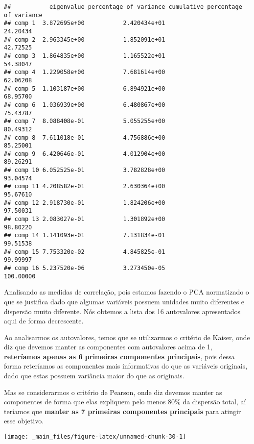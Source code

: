 \documentclass[
]{article}
\begin{document}
\begin{verbatim}
##           eigenvalue percentage of variance cumulative percentage of variance
## comp 1  3.872695e+00           2.420434e+01                          24.20434
## comp 2  2.963345e+00           1.852091e+01                          42.72525
## comp 3  1.864835e+00           1.165522e+01                          54.38047
## comp 4  1.229058e+00           7.681614e+00                          62.06208
## comp 5  1.103187e+00           6.894921e+00                          68.95700
## comp 6  1.036939e+00           6.480867e+00                          75.43787
## comp 7  8.088408e-01           5.055255e+00                          80.49312
## comp 8  7.611018e-01           4.756886e+00                          85.25001
## comp 9  6.420646e-01           4.012904e+00                          89.26291
## comp 10 6.052525e-01           3.782828e+00                          93.04574
## comp 11 4.208582e-01           2.630364e+00                          95.67610
## comp 12 2.918730e-01           1.824206e+00                          97.50031
## comp 13 2.083027e-01           1.301892e+00                          98.80220
## comp 14 1.141093e-01           7.131834e-01                          99.51538
## comp 15 7.753320e-02           4.845825e-01                          99.99997
## comp 16 5.237520e-06           3.273450e-05                         100.00000
\end{verbatim}

Analisando as medidas de correlação, pois estamos fazendo o PCA normatizado o que se justifica dado que algumas variáveis possuem unidades muito diferentes e dispersão muito diferente. Nós obtemos a lista dos 16 autovalores apresentados aqui de forma decrescente.

Ao analisarmos os autovalores, temos que se utilizarmos o critério de Kaiser, onde diz que devemos manter as componentes com autovalores acima de 1, \textbf{reteríamos apenas as 6 primeiras componentes principais}, pois dessa forma reteríamos as componentes mais informativas do que as variáveis originais, dado que estas possuem variância maior do que as originais.

Mas se considerarmos o critério de Pearson, onde diz devemos manter as componentes de forma que elas expliquem pelo menos 80\% da dispersão total, aí teríamos que \textbf{manter as 7 primeiras componentes principais} para atingir esse objetivo.

\begin{center}\texttt{[image: \_main\_files/figure-latex/unnamed-chunk-30-1]} \end{center}
\end{document}
